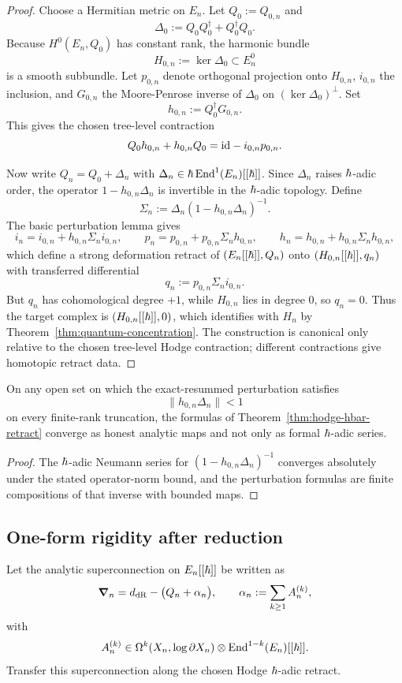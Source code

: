 \begin{proof}
Choose a Hermitian metric on $E_n$. Let $Q_0:=Q_{0,n}$ and
\[
 \Delta_0 := Q_0Q_0^{\dagger}+Q_0^{\dagger}Q_0.
\]
Because $H^0(E_n,Q_0)$ has constant rank, the harmonic bundle
\[
 H_{0,n}:=\ker\Delta_0\subset E_n^0
\]
is a smooth subbundle. Let $p_{0,n}$ denote orthogonal projection onto $H_{0,n}$, $i_{0,n}$ the inclusion, and $G_{0,n}$ the Moore-Penrose inverse of $\Delta_0$ on $(\ker\Delta_0)^\perp$. Set
\[
 h_{0,n}:=Q_0^{\dagger}G_{0,n}.
\]
This gives the chosen tree-level contraction
\[
 Q_0h_{0,n}+h_{0,n}Q_0 = \mathrm{id} - i_{0,n}p_{0,n}.
\]

Now write $Q_n=Q_0+\Delta_n$ with $\Delta_n\in \hbar\,\mathrm{End}^1(E_n)[[\hbar]]$. Since $\Delta_n$ raises $\hbar$-adic order, the operator $1-h_{0,n}\Delta_n$ is invertible in the $\hbar$-adic topology. Define
\[
 \Sigma_n := \Delta_n(1-h_{0,n}\Delta_n)^{-1}.
\]
The basic perturbation lemma gives
\[
 i_n=i_{0,n}+h_{0,n}\Sigma_n i_{0,n},
 \qquad
 p_n=p_{0,n}+p_{0,n}\Sigma_n h_{0,n},
 \qquad
 h_n=h_{0,n}+h_{0,n}\Sigma_n h_{0,n},
\]
which define a strong deformation retract of $(E_n[[\hbar]],Q_n)$ onto $(H_{0,n}[[\hbar]],q_n)$ with transferred differential
\[
 q_n:=p_{0,n}\Sigma_n i_{0,n}.
\]
But $q_n$ has cohomological degree $+1$, while $H_{0,n}$ lies in degree $0$, so $q_n=0$. Thus the target complex is $(H_{0,n}[[\hbar]],0)$, which identifies with $H_n$ by Theorem~\ref{thm:quantum-concentration}. The construction is canonical only relative to the chosen tree-level Hodge contraction; different contractions give homotopic retract data.
\end{proof}

\begin{proposition}%
On any open set on which the exact-resummed perturbation satisfies
\[
 \|h_{0,n}\Delta_n\|<1
\]
on every finite-rank truncation, the formulas of Theorem~\ref{thm:hodge-hbar-retract} converge as honest analytic maps and not only as formal $\hbar$-adic series.
\end{proposition}

\begin{proof}
The $\hbar$-adic Neumann series for $(1-h_{0,n}\Delta_n)^{-1}$ converges absolutely under the stated operator-norm bound, and the perturbation formulas are finite compositions of that inverse with bounded maps.
\end{proof}

\subsection{One-form rigidity after reduction}
Let the analytic superconnection on $E_n[[\hbar]]$ be written as
\[
 \boldsymbol{\nabla}_n = d_{\mathrm{dR}}-\big(Q_n+\alpha_n\big),
 \qquad
 \alpha_n:=\sum_{k\ge 1}A_n^{(k)},
\]
with
\[
 A_n^{(k)}\in \Omega^k(X_n,\log\partial X_n)\otimes \mathrm{End}^{1-k}(E_n)[[\hbar]].
\]
Transfer this superconnection along the chosen Hodge $\hbar$-adic retract.

